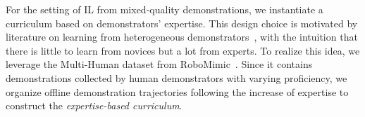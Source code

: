  For the setting of IL from mixed-quality demonstrations, we instantiate a curriculum based on demonstrators' expertise. This design choice is motivated by literature on learning from heterogeneous demonstrators~\citep{beliaev2022imitation, NEURIPS2021_670e8a43}, with the intuition that there is little to learn from novices but a lot from experts. To realize this idea, we leverage the Multi-Human dataset from RoboMimic~\citep{mandlekar2021matters}. Since it contains demonstrations collected by human demonstrators with varying proficiency, we organize offline demonstration trajectories following the increase of expertise to construct the \textit{expertise-based curriculum}.










